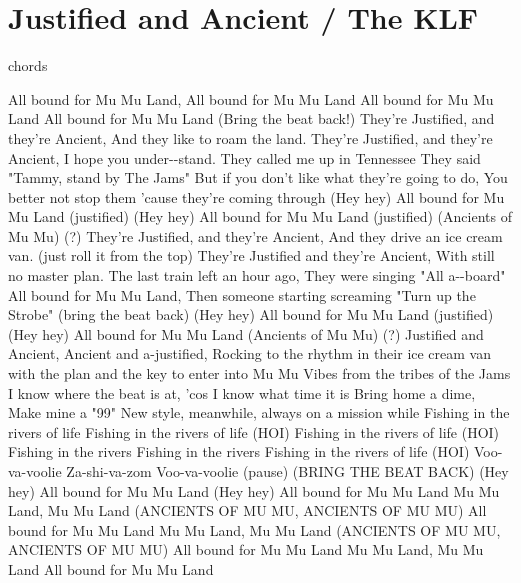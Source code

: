\section{Justified and Ancient / The KLF}\label{sec:justified_and_ancient}
  {\small chords}
  
  \Eminor
  \Dmajor
  \FsharpMinor
  \Gmajor
  \Amajor
  
   All bound for Mu Mu Land, All bound for Mu Mu Land
   
   All bound for Mu Mu Land
   
   All bound for Mu Mu Land
  (Bring the beat back!)
  They're  Justified, and they’re  Ancient,
  And they  like to roam the  land.
  They're  Justified, and they're  Ancient,
  I  hope you under--stand.
  They  called me up in  Tennessee
  They said  "Tammy, stand by The  Jams"
  But  if you don't like what they're  going to do,
  You  better not stop them 'cause they're coming through
    (Hey hey)
   All bound for Mu Mu Land (justified)
    (Hey hey)
   All bound for Mu Mu Land (justified)
  (Ancients of Mu Mu) (?)
  They're  Justified, and they're  Ancient,
  And they  drive an ice cream  van.
  (just roll it from the top)
  They're  Justified and they're  Ancient,
  With  still no master  plan.
  The  last train left an  hour ago,
  They were  singing "All a--board"
   All bound for  Mu Mu Land,
  Then  someone starting screaming "Turn up the Strobe"
  (bring the beat back)
    (Hey hey)
   All bound for Mu Mu Land (justified)
    (Hey hey)
   All bound for Mu Mu Land
  (Ancients of Mu Mu) (?)
   Justified and Ancient, Ancient and a-justified,
  Rocking to the rhythm in their ice cream van
  with the plan and the key to
  enter into Mu Mu
  Vibes from the tribes of the Jams
  I know where the beat is at,
  'cos I know what time it is
  Bring home a dime,
  Make mine a "99"
  New style, meanwhile, always on a mission while
  Fishing in the rivers of life
  Fishing in the rivers of life (HOI)
  Fishing in the rivers of life (HOI)
  Fishing in the rivers
  Fishing in the rivers
  Fishing in the rivers of life (HOI)
  Voo-va-voolie
  Za-shi-va-zom
   Voo-va-voolie (pause)
  (BRING THE BEAT BACK)
    (Hey hey)
   All bound for Mu Mu Land
    (Hey hey)
   All bound for Mu Mu Land
   Mu Mu Land, Mu Mu Land (ANCIENTS OF MU MU, ANCIENTS OF MU MU)
   All bound for Mu Mu Land
   Mu Mu Land, Mu Mu Land (ANCIENTS OF MU MU, ANCIENTS OF MU MU)
   All bound for Mu Mu Land
   Mu Mu Land, Mu Mu Land
  All bound for Mu Mu Land
